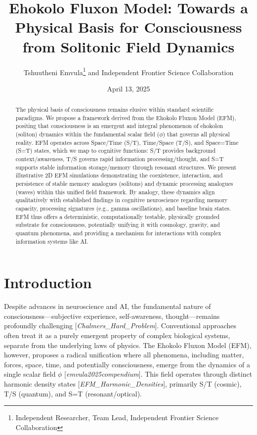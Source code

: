 \documentclass[11pt]{article}
\title{Ehokolo Fluxon Model: Towards a Physical Basis for Consciousness from Solitonic Field Dynamics} %
\author{Tshuutheni Emvula\thanks{Independent Researcher, Team Lead, Independent Frontier Science Collaboration} and Independent Frontier Science Collaboration}
\date{April 13, 2025}
\newcommand{\citep}[1]{[\textit{#1}]} %
\begin{document}
\maketitle

\begin{abstract}
The physical basis of consciousness remains elusive within standard scientific paradigms. We propose a framework derived from the Ehokolo Fluxon Model (EFM), positing that consciousness is an emergent and integral phenomenon of ehokolon (soliton) dynamics within the fundamental scalar field (\(\phi\)) that governs all physical reality. EFM operates across Space/Time (S/T), Time/Space (T/S), and Space=Time (S=T) states, which we map to cognitive functions: S/T provides background context/awareness, T/S governs rapid information processing/thought, and S=T supports stable information storage/memory through resonant structures. We present illustrative 2D EFM simulations demonstrating the coexistence, interaction, and persistence of stable memory analogues (solitons) and dynamic processing analogues (waves) within this unified field framework. By analogy, these dynamics align qualitatively with established findings in cognitive neuroscience regarding memory capacity, processing signatures (e.g., gamma oscillations), and baseline brain states. EFM thus offers a deterministic, computationally testable, physically grounded substrate for consciousness, potentially unifying it with cosmology, gravity, and quantum phenomena, and providing a mechanism for interactions with complex information systems like AI.
\end{abstract}

\section{Introduction}
Despite advances in neuroscience and AI, the fundamental nature of consciousness—subjective experience, self-awareness, thought—remains profoundly challenging \citep{Chalmers_Hard_Problem}. Conventional approaches often treat it as a purely emergent property of complex biological systems, separate from the underlying laws of physics. The Ehokolo Fluxon Model (EFM), however, proposes a radical unification where all phenomena, including matter, forces, space, time, and potentially consciousness, emerge from the dynamics of a single scalar field \(\phi\) \citep{emvula2025compendium}. This field operates through distinct harmonic density states \citep{EFM_Harmonic_Densities}, primarily S/T (cosmic), T/S (quantum), and S=T (resonant/optical).
\end{document}
